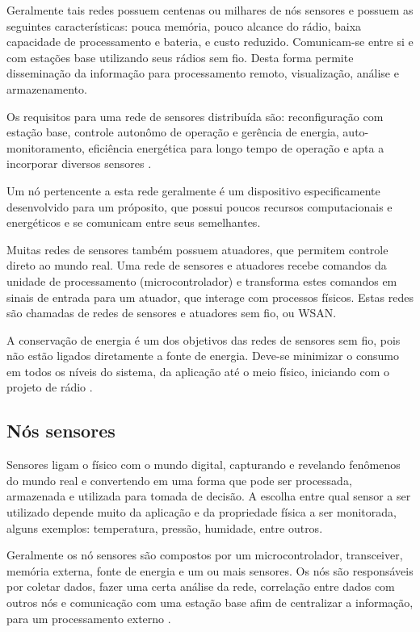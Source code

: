 Geralmente tais redes possuem centenas ou milhares de n\'os sensores e possuem as seguintes caracter\'isticas: pouca mem\'oria, pouco alcance do r\'adio, baixa capacidade de processamento e bateria, e custo reduzido. Comunicam-se entre si e com esta\c{c}\~oes base utilizando seus r\'adios sem fio.  Desta forma permite dissemina\c{c}\~ao da informa\c{c}\~ao para processamento remoto, visualiza\c{c}\~ao, an\'alise e armazenamento. 

Os requisitos para uma rede de sensores distribu\'ida s\~ao: reconfigura\c{c}\~ao com esta\c{c}\~ao base, controle auton\^omo de opera\c{c}\~ao e ger\^encia de energia, auto-monitoramento, efici\^encia energ\'etica para longo tempo de opera\c{c}\~ao e apta a incorporar diversos sensores \cite{542724}.

Um n\'o pertencente a esta rede geralmente \'e um dispositivo especificamente desenvolvido para um pr\'oposito, que possui poucos recursos computacionais e energ\'eticos e se comunicam entre seus semelhantes.

Muitas redes de sensores tamb\'em possuem atuadores, que permitem controle direto ao mundo real. Uma rede de sensores e atuadores recebe comandos da unidade de processamento (microcontrolador) e transforma estes comandos em sinais de entrada para um atuador, que interage com processos f\'isicos. Estas redes s\~ao chamadas de redes de sensores e atuadores sem fio, ou WSAN.

A conserva\c{c}\~ao de energia \'e um dos objetivos das redes de sensores sem fio, pois n\~ao est\~ao ligados diretamente a fonte de energia. Deve-se minimizar o consumo em todos os n\'iveis do sistema, da aplica\c{c}\~ao at\'e o meio f\'isico, iniciando com o projeto de r\'adio \cite{WsnSurvey2008}.

\subsection{N\'os sensores}
Sensores ligam o f\'isico com o mundo digital, capturando e revelando fen\^omenos do mundo real e convertendo em uma forma que pode ser processada, armazenada e utilizada para tomada de decis\~ao. A escolha entre qual sensor a ser utilizado depende muito da aplica\c{c}\~ao e da propriedade f\'isica a ser monitorada, alguns exemplos: temperatura, press\~ao, humidade, entre outros.

Geralmente os n\'o sensores s\~ao compostos por um microcontrolador, transceiver, mem\'oria externa, fonte de energia e um ou mais sensores. Os n\'os s\~ao respons\'aveis por coletar dados, fazer uma certa an\'alise da rede, correla\c{c}\~ao entre dados com outros n\'os e comunica\c{c}\~ao com uma esta\c{c}\~ao base afim de centralizar a informa\c{c}\~ao, para um processamento externo \cite{dargie2010fundamentals}.

